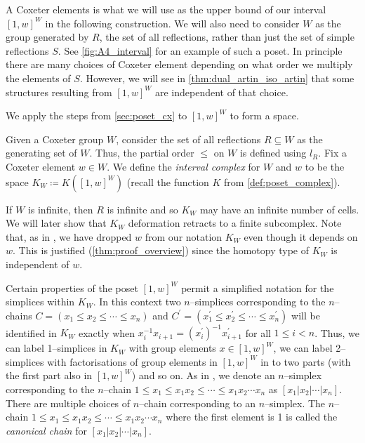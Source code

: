 \documentclass[class=article, crop=false]{standalone}
\begin{document}
A Coxeter elements is what we will use as the upper bound of our interval $[1,w]^W$ in the following construction. We will also need to consider $W$ as the group generated by $R$, the set of all reflections, rather than just the set of simple reflections $S$. See \cref{fig:A4_interval} for an example of such a poset. In principle there are many choices of Coxeter element depending on what order we multiply the elements of $S$. 
However, we will see in \cref{thm:dual_artin_iso_artin} that some structures resulting from $[1,w]^W$ are independent of that choice.

We apply the steps from \cref{sec:poset_cx} to $[1,w]^W$ to form a space.

\begin{definition}
    Given a Coxeter group $W$, consider the set of all reflections $R\subseteq W$ as the generating set of $W$. Thus, the partial order $\leq$ on $W$ is defined using $l_R$. Fix a Coxeter element $w \in W$. We define the \emph{interval complex} for $W$ and $w$ to be the space $K_{W} \coloneq K([1,w]^W)$ (recall the function $K$ from \cref{def:poset_complex}).
    \label{def:interval_complex}
\end{definition}

If $W$ is infinite, then $R$ is infinite and so $K_W$ may have an infinite number of cells. We will later show that $K_W$ deformation retracts to a finite subcomplex. Note that, as in \cite{paolini_salvetti_kpi1_2021}, we have dropped $w$ from our notation $K_{W}$ even though it depends on $w$. This is justified (\cref{thm:proof_overview}) since the homotopy type of $K_W$ is independent of $w$.

Certain properties of the poset $[1,w]^W$ permit a simplified notation for the simplices within $K_{W}$. In this context two $n$--simplices corresponding to the $n$--chains $C=(x_1 \leq x_2 \leq \cdots \leq x_n)$ and $C^\prime = (x_1^\prime \leq x_2^\prime \leq \cdots \leq x_n^\prime)$ will be identified in $K_W$ exactly when $x_i^{-1}x_{i+1} = (x^\prime_i)^{-1}x^\prime_{i+1}$ for all $1\leq i <n$. Thus, we can label 1--simplices in $K_{W}$ with group elements $x \in [1,w]^W$, we can label 2--simplices with factorisations of group elements in $[1,w]^W$ in to two parts (with the first part also in $[1,w]^W$) and so on.
As in \cite[Definition 2.8]{paolini_salvetti_kpi1_2021}, we denote an $n$--simplex corresponding to the $n$--chain $1 \leq x_1 \leq x_1x_2 \leq \cdots \leq x_1x_2\cdots x_n$ as $[x_1 | x_2 | \cdots | x_n]$. There are multiple choices of $n$--chain corresponding to an $n$--simplex.
The $n$--chain $1 \leq x_1 \leq x_1x_2 \leq \cdots \leq x_1x_2\cdots x_n$ where the first element is 1 is called the \emph{canonical chain} for $[x_1 | x_2 | \cdots | x_n]$. 
\end{document}
